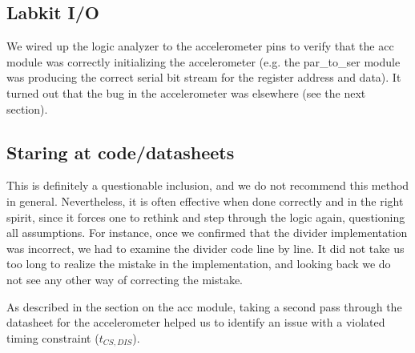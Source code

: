 \documentclass{article}
\begin{document}
\subsection{Labkit I/O}
We wired up the logic analyzer to the accelerometer pins to verify that the acc module was correctly initializing the accelerometer (e.g. the par\_to\_ser module was producing the correct serial bit stream for the register address and data). It turned out that the bug in the accelerometer was elsewhere (see the next section).

\subsection{Staring at code/datasheets}
This is definitely a questionable inclusion, and we do not recommend this method in general.
Nevertheless, it is often effective when done correctly and in the right spirit,
since it forces one to rethink and step through the logic again, questioning all assumptions.
For instance, once we confirmed that the divider implementation was incorrect,
we had to examine the divider code line by line.
It did not take us too long to realize the mistake in the implementation,
and looking back we do not see any other way of correcting the mistake.

As described in the section on the acc module, taking a second pass through the datasheet for the accelerometer helped us to identify an issue with a violated timing constraint ($t_{CS,DIS}$).
\end{document}
